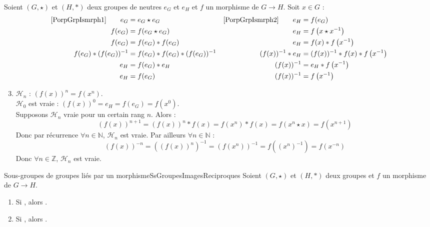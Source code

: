 \documentclass[12pt,a4paper]{report}
\begin{document}
    \begin{demo}[Démonstrations]
    Soient $(G, \star)$ et $(H, \ast)$ deux groupes de neutres $e_G$ et $e_H$ et $f$ un morphisme de $G \rightarrow H$. Soit $x \in G$ :
    \begin{align*}
        \text{\ref{PorpGrpIsmrph1}} \qquad e_G &= e_G \star e_G
        & \text{\ref{PorpGrpIsmrph2}} \qquad e_H &= f(e_G) \\
        f(e_G) &= f(e_G \star e_G)
        & e_H &= f\left(x \star x^{-1}\right) \\
        f(e_G) &= f(e_G) \ast f(e_G)
        & e_H &= f(x) \ast f\left(x^{-1}\right) \\
        f(e_G) \ast (f(e_G))^{-1} &= f(e_G) \ast f(e_G) \ast (f(e_G))^{-1}
        & (f(x))^{-1} \ast e_H &= (f(x))^{-1} \ast f(x) \ast f\left(x^{-1}\right) \\
        e_H &= f(e_G) \ast e_H
        & (f(x))^{-1} &= e_H \ast f\left(x^{-1}\right) \\
        e_H &= f(e_G)
        & (f(x))^{-1} &= f\left(x^{-1}\right)
    \end{align*}
    \begin{enumerate}[label=\bfseries\arabic*)]
        \setcounter{enumi}{2}
        \item $\mathcal{H}_n$ : $(f(x))^n = f\left(x^n\right)$.\\
        $\mathcal{H}_0$ est vraie : $(f(x))^0 = e_H = f(e_G) = f\left( x^0 \right)$.\\
        Supposons $\mathcal{H}_n$ vraie pour un certain rang $n$. Alors :
        $$ (f(x))^{n+1} = (f(x))^n \ast f(x) = f(x^n) \ast f(x) = f(x^n \star x) = f\left( x^{n+1} \right) $$
        Donc par récurrence $\forall n \in \mathbb{N}$, $\mathcal{H}_n$ est vraie. Par ailleurs $\forall n \in \mathbb{N}$ :
        $$ (f(x))^{-n} = \left((f(x))^n\right)^{-1} = (f(x^n))^{-1} = f\left((x^n)^{-1}\right) = f\left(x^{-n}\right) $$
        Donc $\forall n \in \mathbb{Z}$, $\mathcal{H}_n$ est vraie.
    \end{enumerate}
    \end{demo}
    
    \begin{propositions}{Sous-groupes de groupes liés par un morphisme}{SsGroupesImagesReciproques}
    Soient $(G, \star)$ et $(H, \ast)$ deux groupes et $f$ un morphisme de $G \rightarrow H$.
    \begin{enumerate}[label=\bfseries\arabic*)]
        \item Si , alors .
        \item Si , alors .
    \end{enumerate}
    \end{propositions}
    
\end{document}
